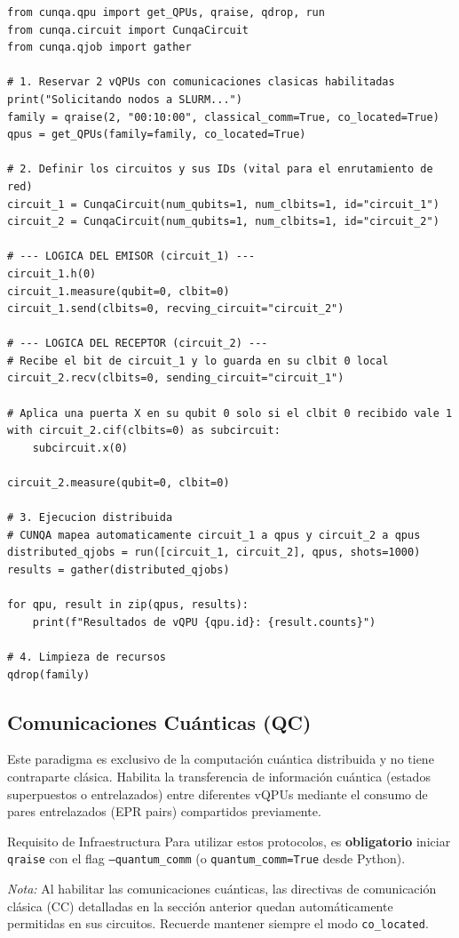 \documentclass[a4paper,11pt]{article}
\begin{document}
\begin{lstlisting}[style=pythonstyle, caption=Ejemplo: Control Clásico Remoto entre dos vQPUs]
from cunqa.qpu import get_QPUs, qraise, qdrop, run
from cunqa.circuit import CunqaCircuit
from cunqa.qjob import gather

# 1. Reservar 2 vQPUs con comunicaciones clasicas habilitadas
print("Solicitando nodos a SLURM...")
family = qraise(2, "00:10:00", classical_comm=True, co_located=True)
qpus = get_QPUs(family=family, co_located=True)

# 2. Definir los circuitos y sus IDs (vital para el enrutamiento de red)
circuit_1 = CunqaCircuit(num_qubits=1, num_clbits=1, id="circuit_1")
circuit_2 = CunqaCircuit(num_qubits=1, num_clbits=1, id="circuit_2")

# --- LOGICA DEL EMISOR (circuit_1) ---
circuit_1.h(0)
circuit_1.measure(qubit=0, clbit=0)
circuit_1.send(clbits=0, recving_circuit="circuit_2")

# --- LOGICA DEL RECEPTOR (circuit_2) ---
# Recibe el bit de circuit_1 y lo guarda en su clbit 0 local
circuit_2.recv(clbits=0, sending_circuit="circuit_1")

# Aplica una puerta X en su qubit 0 solo si el clbit 0 recibido vale 1
with circuit_2.cif(clbits=0) as subcircuit:
    subcircuit.x(0)

circuit_2.measure(qubit=0, clbit=0)

# 3. Ejecucion distribuida
# CUNQA mapea automaticamente circuit_1 a qpus y circuit_2 a qpus
distributed_qjobs = run([circuit_1, circuit_2], qpus, shots=1000)
results = gather(distributed_qjobs)

for qpu, result in zip(qpus, results):
    print(f"Resultados de vQPU {qpu.id}: {result.counts}")

# 4. Limpieza de recursos
qdrop(family)
\end{lstlisting}

\subsection{Comunicaciones Cuánticas (QC)}

Este paradigma es exclusivo de la computación cuántica distribuida y no tiene contraparte clásica. Habilita la transferencia de información cuántica (estados superpuestos o entrelazados) entre diferentes vQPUs mediante el consumo de pares entrelazados (EPR pairs) compartidos previamente. 

\begin{infobox}{Requisito de Infraestructura}
Para utilizar estos protocolos, es \textbf{obligatorio} iniciar \texttt{qraise} con el flag \texttt{--quantum\_comm} (o \texttt{quantum\_comm=True} desde Python). 

\textit{Nota:} Al habilitar las comunicaciones cuánticas, las directivas de comunicación clásica (CC) detalladas en la sección anterior quedan automáticamente permitidas en sus circuitos. Recuerde mantener siempre el modo \texttt{co\_located}.
\end{infobox}
\end{document}
